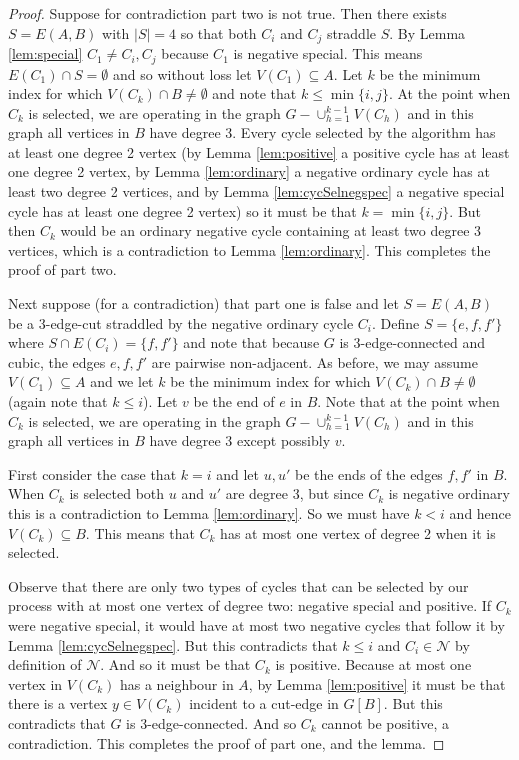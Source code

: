 \documentclass[12pt]{article}
\begin{document}
\begin{proof}
  Suppose for contradiction part two is not true.  Then there exists $S = E(A,B)$ with $|S| = 4$ so that both $C_i$ and $C_j$ straddle $S$.  By Lemma \ref{lem:special} $C_1 \neq C_i,C_j$ because $C_1$ is negative special. This means $E(C_1) \cap S = \emptyset$ and so without loss let $V(C_1) \subseteq A$. Let $k$ be the minimum index for which $V(C_k) \cap B \neq \emptyset$ and note that $k \le \min\{i,j\}$.  At the point when $C_k$ is selected, we are operating in the graph $G - \cup_{h=1}^{k-1} V(C_h)$ and in this graph all vertices in $B$ have degree 3.  Every cycle selected by the algorithm has at least one degree 2 vertex (by Lemma \ref{lem:positive} a positive cycle has at least one degree 2 vertex, by Lemma \ref{lem:ordinary} a negative ordinary cycle has at least two degree 2 vertices, and by Lemma \ref{lem:cycSelnegspec} a negative special cycle has at least one degree 2 vertex) so it must be that $k = \min\{i,j\}$.  But then $C_k$ would be an ordinary negative cycle containing at least two degree 3 vertices, which is a contradiction to Lemma \ref{lem:ordinary}. This completes the proof of part two.
  
Next suppose (for a contradiction) that part one is false and let $S = E(A,B)$ be a 3-edge-cut straddled by the negative ordinary cycle $C_i$.  Define $S = \{e,f,f'\}$ where $S \cap E(C_i) = \{f,f'\}$ and note that because $G$ is 3-edge-connected and cubic, the edges $e,f,f'$ are pairwise non-adjacent.  
As before, we may assume $V(C_1) \subseteq A$ and we let $k$ be the minimum index for which $V(C_k) \cap B \neq \emptyset$ (again note that $k \le i$).  Let $v$ be the end of $e$ in $B$.  Note that at the point when $C_k$ is selected, we are operating in the graph $G - \cup_{h=1}^{k-1} V(C_h)$ and in this graph all vertices in $B$ have degree 3 except possibly $v$.  

First consider the case that $k = i$ and let $u,u'$ be the ends of the edges $f,f'$ in $B$.  When $C_k$ is selected both $u$ and $u'$ are degree 3, but since $C_k$ is negative ordinary this is a contradiction to Lemma \ref{lem:ordinary}. So we must have $k < i$ and hence $V(C_k) \subseteq B$. This means that $C_k$ has at most one vertex of degree 2 when it is selected.

Observe that there are only two types of cycles that can be selected by our process with at most one vertex of degree two: negative special and positive. If $C_k$ were negative special, it would have at most two negative cycles that follow it by Lemma \ref{lem:cycSelnegspec}. But this contradicts that $k \le i$ and $C_i \in \mathcal{N}$ by definition of $\mathcal{N}$. And so it must be that $C_k$ is positive. Because at most one vertex in $V(C_k)$ has a neighbour in $A$, by Lemma \ref{lem:positive} it must be that there is a vertex $y \in V(C_k)$ incident to a cut-edge in $G[B]$. But this contradicts that $G$ is 3-edge-connected. And so $C_k$ cannot be positive, a contradiction. This completes the proof of part one, and the lemma.     
\end{proof}
\end{document}
